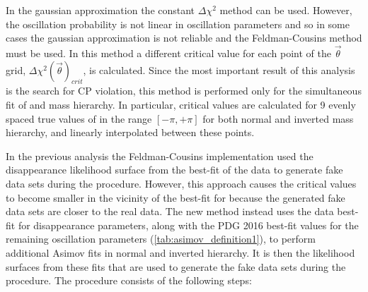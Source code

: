 In the gaussian approximation the constant $\Delta \chi^2$ method can be used. However, the oscillation probability is not linear in oscillation parameters and so in some cases the gaussian approximation is not reliable and the Feldman-Cousins method \cite{FeldmanCousins} must be used. In this method a different critical value for each point of the $\vec{\theta}$ grid, $\Delta \chi^2 (\vec{\theta})_{crit}$, is calculated. Since the most important result of this analysis is the search for CP violation, this method is performed only for the simultaneous fit of \deltacp and mass hierarchy. In particular, critical values are calculated for 9 evenly spaced true values of \deltacp in the range $[-\pi,+\pi]$ for both normal and inverted mass hierarchy, and linearly interpolated between these points.

In the previous analysis the Feldman-Cousins implementation used the disappearance likelihood surface from the best-fit of the data to generate fake data sets during the procedure. However, this approach causes the critical values to become smaller in the vicinity of the best-fit for \deltacp because the generated fake data sets are closer to the real data. The new method \cite{NewFC} instead uses the data best-fit for disappearance parameters, along with the PDG 2016 best-fit values for the remaining oscillation parameters (\cref{tab:asimov_definition1}), to perform additional Asimov fits in normal and inverted hierarchy. It is then the likelihood surfaces from these fits that are used to generate the fake data sets during the procedure. The procedure consists of the following steps:

